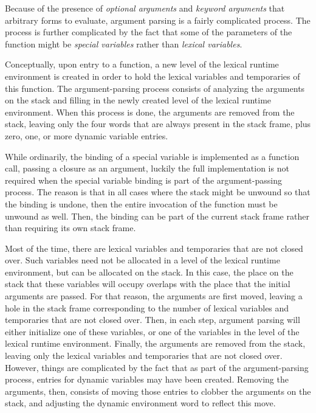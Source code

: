 Because of the presence of \emph{optional arguments} and \emph{keyword
  arguments} that arbitrary forms to evaluate, argument parsing is a
fairly complicated process.  The process is further complicated by the
fact that some of the parameters of the function might be
\emph{special variables} rather than \emph{lexical variables}.

Conceptually, upon entry to a function, a new level of the lexical
runtime environment is created in order to hold the lexical variables
and temporaries of this function.  The argument-parsing process
consists of analyzing the arguments on the stack and filling in the
newly created level of the lexical runtime environment.  When this
process is done, the arguments are removed from the stack, leaving
only the four words that are always present in the stack frame, plus
zero, one, or more dynamic variable entries.

While ordinarily, the binding of a special variable is implemented as
a function call, passing a closure as an argument, luckily the full
implementation is not required when the special variable binding is
part of the argument-passing process.  The reason is that in all cases
where the stack might be unwound so that the binding is undone, then
the entire invocation of the function must be unwound as well.  Then,
the binding can be part of the current stack frame rather than
requiring its own stack frame.

Most of the time, there are lexical variables and temporaries that are
not closed over.  Such variables need not be allocated in a level of
the lexical runtime environment, but can be allocated on the stack.
In this case, the place on the stack that these variables will occupy
overlaps with the place that the initial arguments are passed.  For
that reason, the arguments are first moved, leaving a hole in the
stack frame corresponding to the number of lexical variables and
temporaries that are not closed over.  Then, in each step, argument
parsing will either initialize one of these variables, or one of the
variables in the level of the lexical runtime environment.  Finally,
the arguments are removed from the stack, leaving only the lexical
variables and temporaries that are not closed over.  However, things
are complicated by the fact that as part of the argument-parsing
process, entries for dynamic variables may have been created.
Removing the arguments, then, consists of moving those entries to
clobber the arguments on the stack, and adjusting the dynamic
environment word to reflect this move.


